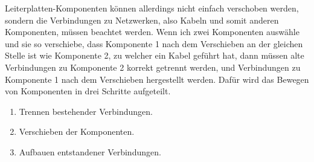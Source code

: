 \documentclass{article}
\begin{document}
    Leiterplatten-Komponenten können allerdings nicht einfach verschoben werden, sondern die Verbindungen zu Netzwerken,
    also Kabeln und somit anderen Komponenten, müssen beachtet werden.
    Wenn ich zwei Komponenten auswähle und sie so verschiebe,
    dass Komponente 1 nach dem Verschieben an der gleichen Stelle ist wie Komponente 2, zu welcher ein Kabel geführt hat,
    dann müssen alte Verbindungen zu Komponente 2 korrekt getrennt werden, und Verbindungen zu Komponente 1 nach dem Verschieben
    hergestellt werden.
    Dafür wird das Bewegen von Komponenten in drei Schritte aufgeteilt.
    \begin{enumerate}
        \item Trennen bestehender Verbindungen.
        \item Verschieben der Komponenten.
        \item Aufbauen entstandener Verbindungen.
    \end{enumerate}
\end{document}
